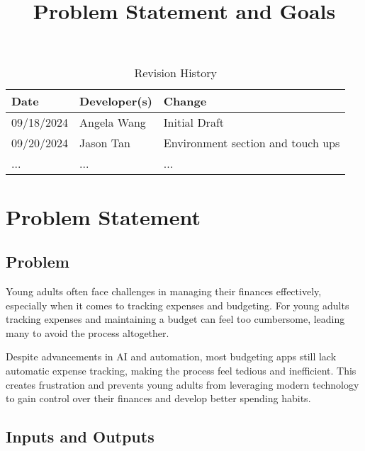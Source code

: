\documentclass{article}
\title{Problem Statement and Goals\\\progname}
\author{\authname}
\date{}
\begin{document}
\maketitle

\begin{table}[hp]
\caption{Revision History} \label{TblRevisionHistory}
\begin{tabularx}{\textwidth}{llX}
\toprule
\textbf{Date} & \textbf{Developer(s)} & \textbf{Change}\\
\midrule
09/18/2024 & Angela Wang & Initial Draft\\
09/20/2024 & Jason Tan & Environment section and touch ups\\
... & ... & ...\\
\bottomrule
\end{tabularx}
\end{table}

\section{Problem Statement}



\subsection{Problem}

Young adults often face challenges in managing their finances effectively,
especially when it comes to tracking expenses and budgeting. For young adults
tracking expenses and maintaining a budget can feel too cumbersome, leading many
to avoid the process altogether. 

Despite advancements in AI and automation, most budgeting apps still lack
automatic expense tracking, making the process feel tedious and inefficient.
This creates frustration and prevents young adults from leveraging modern
technology to gain control over their finances and develop better spending
habits.


\subsection{Inputs and Outputs}
\end{document}
